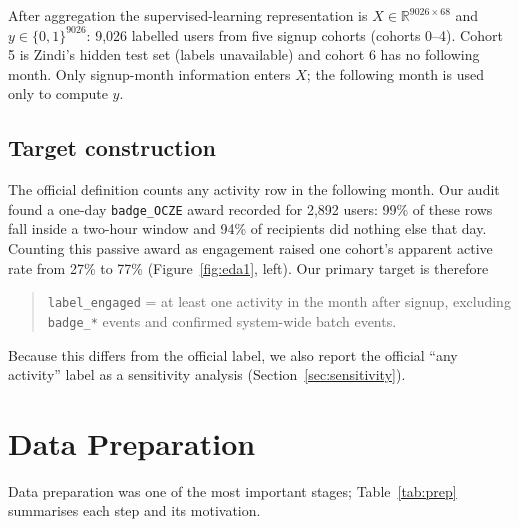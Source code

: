 \documentclass[11pt,a4paper]{article}
\begin{document}
After aggregation the supervised-learning representation is $X \in \mathbb{R}^{9026\times 68}$ and
$y\in\{0,1\}^{9026}$: 9{,}026 labelled users from five signup cohorts (cohorts 0--4). Cohort 5 is Zindi's
hidden test set (labels unavailable) and cohort 6 has no following month. Only signup-month information enters
$X$; the following month is used only to compute $y$.

\subsection{Target construction}
The official definition counts any activity row in the following month. Our audit found a one-day
\texttt{badge\_OCZE} award recorded for 2{,}892 users: 99\% of these rows fall inside a two-hour window and
94\% of recipients did nothing else that day. Counting this passive award as engagement raised one cohort's
apparent active rate from 27\% to 77\% (Figure~\ref{fig:eda1}, left). Our primary target is therefore
\begin{quote}
\texttt{label\_engaged} = at least one activity in the month after signup, excluding \texttt{badge\_*} events
and confirmed system-wide batch events.
\end{quote}
Because this differs from the official label, we also report the official ``any activity'' label as a
sensitivity analysis (Section~\ref{sec:sensitivity}).

\section{Data Preparation}
Data preparation was one of the most important stages; Table~\ref{tab:prep} summarises each step and its
motivation.
\end{document}
